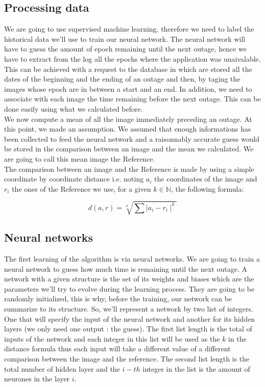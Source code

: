 \documentclass[10pt,a4paper,oneside]{article}
\begin{document}
\begin{multicols}{2}
\subsection{Processing data}
We are going to use supervised machine learning, therefore we need to label the historical data we'll use to train our neural network. The neural network will have to guess the amount of epoch remaining until the next outage, hence we have to extract from the log all the epochs where the application was unaivalable. This can be achieved with a request to the database in which are stored all the dates of the beginning and the ending of an outage and then, by taging the images whose epoch are in between a start and an end.
 In addition, we need to associate with each image the time remaining before the next outage. This can be done easily using what we calculated before.
\\We now compute a mean of all the image immediately preceding an outage. At this point, we made an assumption. We assumed that enough informations has been collected to feed the neural network and a raisonnably accurate guess would be stored in the comparison between an image and the mean we calculated. We are going to call this mean image the Reference.
\\The comparison between an image and the Reference is made by using a simple coordinate by coordinate distance i.e. noting $a_{i}$ the coordinates of the image and $r_{i}$ the ones of the Reference we use, for a given $k\in\mathbb{N}$, the following formula:

\vspace{0.8cm}

\begin{Large}
\[ d(a, r) = \sqrt[k]{\sum \mid{a_i - r_i}\mid^{k}} \]
\end{Large}

\vspace{0.8cm}

\subsection{Neural networks}
The first learning of the algorithm is via neural networks. We are going to train a neural network to guess how much time is remaining until the next outage. A network with a given structure is the set of its weights and biases which are the parameters we'll try to evolve during the learning process. They are going to be randomly initialized, this is why, before the training, our network can be summarize to its structure. So, we'll represent a network by two list of integers. One that will specify the input of the neural network and another for its hidden layers (we only need one output : the guess). The first list length is the total of inputs of the network and each integer in this list will be used as the $k$ in the distance formula thus each input will take a different value of a different comparison between the image and the reference. The second list length is the total number of hidden layer and the $i-th$ integer in the list is the amount of neurones in the layer $i$.
\end{multicols}
\end{document}
